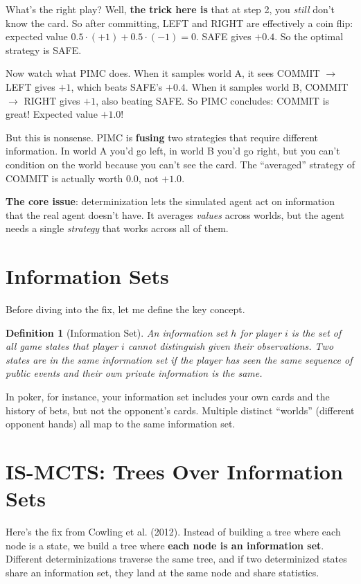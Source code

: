 \documentclass[11pt]{article}
\newtheorem{definition}{Definition}
\begin{document}
What's the right play? Well, \textbf{the trick here is} that at step 2, you \emph{still} don't know the card. So after committing, LEFT and RIGHT are effectively a coin flip: expected value $0.5 \cdot (+1) + 0.5 \cdot (-1) = 0$. SAFE gives $+0.4$. So the optimal strategy is SAFE.

Now watch what PIMC does. When it samples world A, it sees COMMIT $\to$ LEFT gives $+1$, which beats SAFE's $+0.4$. When it samples world B, COMMIT $\to$ RIGHT gives $+1$, also beating SAFE. So PIMC concludes: COMMIT is great! Expected value $+1.0$!

But this is nonsense. PIMC is \textbf{fusing} two strategies that require different information. In world A you'd go left, in world B you'd go right, but you can't condition on the world because you can't see the card. The ``averaged'' strategy of COMMIT is actually worth $0.0$, not $+1.0$.

\textbf{The core issue}: determinization lets the simulated agent act on information that the real agent doesn't have. It averages \emph{values} across worlds, but the agent needs a single \emph{strategy} that works across all of them.

\section{Information Sets}

Before diving into the fix, let me define the key concept.

\begin{definition}[Information Set]
An information set $h$ for player $i$ is the set of all game states that player $i$ cannot distinguish given their observations. Two states are in the same information set if the player has seen the same sequence of public events and their own private information is the same.
\end{definition}

In poker, for instance, your information set includes your own cards and the history of bets, but not the opponent's cards. Multiple distinct ``worlds'' (different opponent hands) all map to the same information set.

\section{IS-MCTS: Trees Over Information Sets}

Here's the fix from Cowling et al. (2012). Instead of building a tree where each node is a state, we build a tree where \textbf{each node is an information set}. Different determinizations traverse the same tree, and if two determinized states share an information set, they land at the same node and share statistics.
\end{document}
